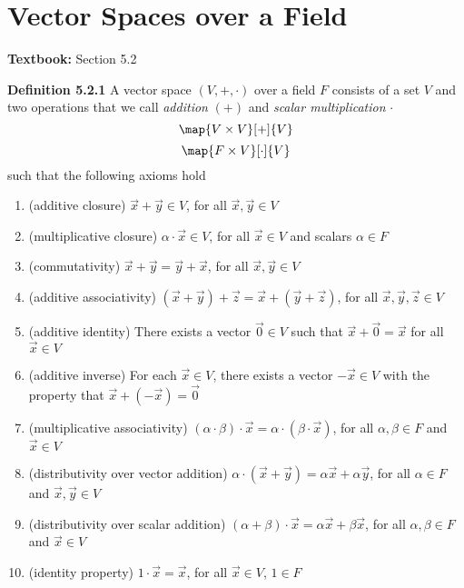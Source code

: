 \documentclass[letterpaper, 10pt]{article}
\begin{document}
\newpage
\section*{Vector Spaces over a Field}%
\textbf{Textbook:} Section 5.2


\lb
\textbf{Definition 5.2.1}
\pr
A vector space $(V, + , \cdot)$ over a field $F$ consists of a set $V$ and two operations that we
call \emph{addition} $(+)$ and \emph{scalar multiplication} $\cdot$
\[ \map{V \times V}[+]{V} \]
\[ \map{F \times V}[\cdot]{V} \]
such that the following axioms hold
\begin{enumerate}
    \item
        (additive closure)
        \qquad $\vec x + \vec y ∈ V$,
        for all $\vec x, \vec y ∈ V$
    \item
        (multiplicative closure)
        \qquad $α \cdot \vec x ∈ V$,
        for all $\vec x ∈ V$ and scalars $α ∈ F$
    \item
        (commutativity)
        \qquad $\vec x + \vec y = \vec y + \vec x$,
        for all $\vec x, \vec y ∈ V$
    \item
        (additive associativity)
        \qquad $(\vec x + \vec y) + \vec z =\vec x + (\vec y + \vec z)$,
        for all $\vec x , \vec y , \vec z ∈ V$
    \item
        (additive identity)
        \qquad There exists a vector $\vec 0 ∈ V$ such that $\vec x + \vec 0 = \vec x$
        for all $\vec x ∈  V$
    \item
        (additive inverse)
        \qquad For each $\vec x ∈ V$, there exists a vector $- \vec x ∈ V$
        with the property that $\vec x + (- \vec x) = \vec 0$
    \item
        (multiplicative associativity)
        \qquad $(α \cdot β) \cdot \vec x = α \cdot ( β \cdot \vec x)$,
        for all $α, β ∈ F$ and $\vec x ∈ V$
    \item
        (distributivity over vector addition)
        \qquad $α \cdot ( \vec x + \vec y) = α \vec x + α \vec y$,
        for all $α ∈ F$ and $\vec x, \vec y ∈ V$
    \item
        (distributivity over scalar addition)
        \qquad $(α + β) \cdot  \vec x = α \vec x + β \vec x$,
        for all $α, β ∈ F$ and $\vec x ∈ V$
    \item
        (identity property)
        \qquad $1 \cdot \vec x = \vec x$,
        for all $\vec x ∈ V$, $1 ∈ F$
\end{enumerate}
\end{document}
